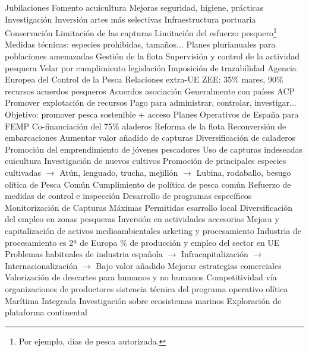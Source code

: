 \documentclass{nuevotema}
\begin{document}
\begin{esquemal}
				\4 Jubilaciones
				\4 Fomento acuicultura
				\4 Mejoras seguridad, higiene, prácticas
				\4 Investigación
				\4 Inversión artes más selectivas
				\4 Infraestructura portuaria
			\3 Conservación
				\4 Limitación de las capturas
				\4 Limitación del esfuerzo pesquero\footnote{Por ejemplo, días de pesca autorizada.}
				\4 Medidas técnicas: especies prohibidas, tamaños...
				\4 Planes plurianuales para poblaciones amenazadas
				\4 Gestión de la flota
			\3 Supervisión y control de la actividad pesquera
				\4 Velar por cumplimiento legislación
				\4 Imposición de trazabilidad
				\4 Agencia Europea del Control de la Pesca
			\3 Relaciones extra-UE
				\4 ZEE: 35\% mares, 90\% recursos
				 acuerdos pesqueros
				\4 Acuerdos asociación
				\4[] Generalmente con países ACP
				\4[] Promover explotación de recursos
				\4[] Pago para administrar, controlar, investigar...
				\4[] Objetivo: promover pesca sostenible + acceso
			\3 Planes Operativos de España para FEMP
				\4 Co-financiación del 75\%
				\4[1] aladeros
				\4[] Reforma de la flota
				\4[] Reconversión de embarcaciones
				\4[] Aumentar valor añadido de capturas
				\4[] Diversificación de caladeros
				\4[] Promoción del emprendimiento de jóvenes pescadores
				\4[] Uso de capturas indeseadas
				\4[2] cuicultura
				\4[] Investigación de nuevos cultivos
				\4[] Promoción de principales especies cultivadas
				\4[] $\to$ Atún, lenguado, trucha, mejillón
				\4[] $\to$ Lubina, rodaballo, besugo
				\4[3] olítica de Pesca Común
				\4[] Cumplimiento de política de pesca común
				\4[] Refuerzo de medidas de control e inspección
				\4[] Desarrollo de programas específicos
				\4[] Monitorización de Capturas Máximas Permitidas
				\4[4] esarrollo local
				\4[] Diversificación del empleo en zonas pesqueras
				\4[] Inversión en actividades accesorias
				\4[] Mejora y capitalización de activos medioambientales
				\4[5]arketing y procesamiento
				\4[] Industria de procesamiento es 2ª de Europa
				\% de producción y empleo del sector en UE
				\4[] Problemas habituales de industria española
				\4[] $\to$ Infracapitalización
				\4[] $\to$ Internacionalización
				\4[] $\to$ Bajo valor añadido
				\4[] Mejorar estrategias comerciales
				\4[] Valorización de descartes para humanos y no humanos
				\4[] Competitividad vía organizaciones de productores
				\4[6] sistencia técnica del programa operativo
				\4[7] olítica Marítima Integrada
				\4[] Investigación sobre ecosistemas marinos
				\4[] Exploración de plataforma continental

\end{esquemal}
\end{document}

